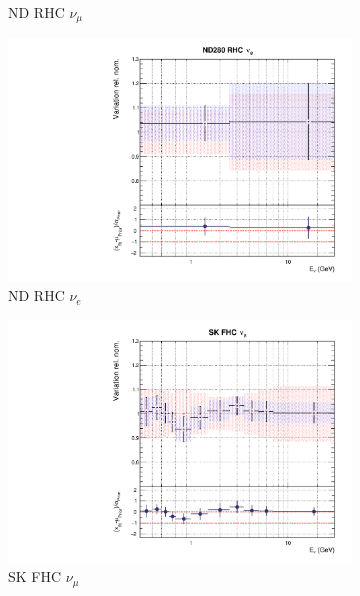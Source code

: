 \begin{figure}[t]
\begin{subfigure}{0.24\textwidth}
  \caption{ND RHC $\nu_{\mu}$}
  \label{fig:}
\end{subfigure}
\vspace{15mm}
\begin{subfigure}{0.24\textwidth}
  \centering
  \includegraphics[width=0.95\linewidth]{figs/rhcmpdat248flux_7}
  \caption{ND RHC $\nu_e$}
  \label{fig:}
\end{subfigure}
\begin{subfigure}{0.24\textwidth}
  \centering
  \includegraphics[width=0.95\linewidth]{figs/rhcmpdat248flux_8}
  \caption{SK FHC $\nu_{\mu}$}
  \label{fig:}
\end{subfigure}
\begin{subfigure}{0.24\textwidth}
  \centering

\end{subfigure}
\end{figure}
